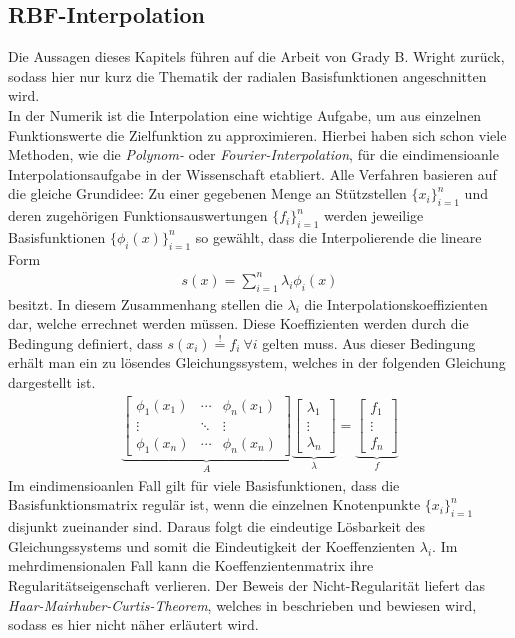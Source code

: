 \documentclass[12pt,titlepage]{article}
\begin{document}
\subsection{RBF-Interpolation}
Die Aussagen dieses Kapitels führen auf die Arbeit von Grady B. Wright \cite{wright2003radial} zurück, sodass  hier nur kurz die Thematik der radialen Basisfunktionen angeschnitten wird.\\
In der Numerik ist die Interpolation eine wichtige Aufgabe, um aus einzelnen Funktionswerte die Zielfunktion zu approximieren. Hierbei haben sich schon viele Methoden, wie die \textit{Polynom-} oder \textit{Fourier-Interpolation}, für die eindimensioanle Interpolationsaufgabe in der Wissenschaft etabliert. Alle Verfahren basieren auf die gleiche Grundidee: Zu einer gegebenen Menge an Stützstellen $\{x_i\}_{i=1}^n$ und deren zugehörigen Funktionsauswertungen $\{f_i\}_{i=1}^n$ werden jeweilige Basisfunktionen $\{\phi_i(x)\}_{i=1}^n$ so gewählt, dass die Interpolierende die lineare Form
\begin{align}
 s(x)=\sum_{i=1}^n\lambda_i\phi_i(x)
\end{align}
besitzt. In diesem Zusammenhang stellen die $\lambda_i$ die Interpolationskoeffizienten dar, welche errechnet werden müssen. Diese Koeffizienten werden durch die Bedingung definiert, dass $s(x_i)\overset{!}{=}f_i~\forall i$ gelten muss. Aus dieser Bedingung erhält man ein zu lösendes Gleichungssystem, welches in der folgenden Gleichung dargestellt ist.
\begin{align}
\underbrace{\begin{bmatrix}
 \phi_1(x_1) & \cdots & \phi_n(x_1) \\ \vdots & \ddots & \vdots \\ \phi_1(x_n) & \cdots & \phi_n(x_n)
\end{bmatrix}}_{A}
\underbrace{\begin{bmatrix}
 \lambda_1 \\ \vdots \\ \lambda_n
\end{bmatrix}}_{\lambda}
=
\underbrace{\begin{bmatrix}
 f_1 \\ \vdots \\ f_n
\end{bmatrix}}_{f}\label{eq:Intermatrix}
\end{align}
Im eindimensioanlen Fall gilt für viele Basisfunktionen, dass die Basisfunktionsmatrix regulär ist, wenn die einzelnen Knotenpunkte $\{x_i\}_{i=1}^n$ disjunkt zueinander sind. Daraus folgt die eindeutige Lösbarkeit des Gleichungssystems und somit die Eindeutigkeit der Koeffenzienten $\lambda_i$. Im mehrdimensionalen Fall kann die Koeffenzientenmatrix ihre Regularitätseigenschaft verlieren. Der Beweis der Nicht-Regularität liefert das \textit{Haar-Mairhuber-Curtis-Theorem}, welches in \cite{de2013four} beschrieben und bewiesen wird, sodass es hier nicht näher erläutert wird.\\
\end{document}
